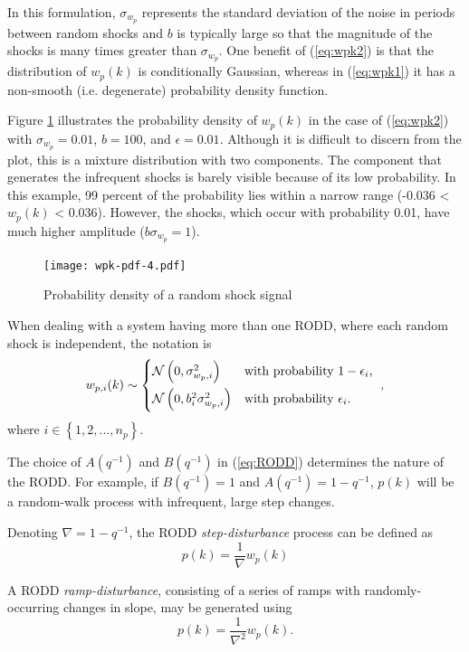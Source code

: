 In this formulation, $\sigma_{w_p}$ represents the standard deviation of the noise in periods between random shocks and $b$ is typically large so that the magnitude of the shocks is many times greater than $\sigma_{w_p}$. One benefit of (\ref{eq:wpk2}) is that the distribution of $w_p(k)$ is conditionally Gaussian, whereas in (\ref{eq:wpk1}) it has a non-smooth (i.e. degenerate) probability density function.

Figure \ref{fig:wpk-pdf} illustrates the probability density of $w_p(k)$ in the case of (\ref{eq:wpk2}) with $\sigma_{w_p}=0.01$, $b=100$, and $\epsilon=0.01$. Although it is difficult to discern from the plot, this is a mixture distribution with two components. The component that generates the infrequent shocks is barely visible because of its low probability. In this example, 99 percent of the probability lies within a narrow range (-0.036 < $w_p(k)$ < 0.036). However, the shocks, which occur with probability 0.01, have much higher amplitude ($b\sigma_{w_p}=1$).

\begin{figure}[htp]
	\centering
	\texttt{[image: wpk-pdf-4.pdf]}
	\caption{Probability density of a random shock signal}
	\label{fig:wpk-pdf}
\end{figure}

When dealing with a system having more than one RODD, where each random shock is independent, the notation is
\begin{equation} \label{eq:wpik2}
	w_{p,i}(k) \sim 
	\begin{cases*}
		\mathcal{N}\left(0, \sigma_{w_p,i}^2\right) & with probability $1-\epsilon_i$, \\
		\mathcal{N}\left(0, b_i^2\sigma_{w_p,i}^2\right) & with probability $\epsilon_i$.
	\end{cases*},
\end{equation}
where $i \in \left\{1, 2, ..., n_p\right\}$.

The choice of $A(q^{-1})$ and $B(q^{-1})$ in (\ref{eq:RODD}) determines the nature of the RODD. For example, if $B(q^{-1})=1$ and $A(q^{-1})=1-q^{-1}$, $p(k)$ will be a random-walk process with infrequent, large step changes.

Denoting $\nabla=1-q^{-1}$, the RODD \textit{step-disturbance} process can be defined as
\begin{equation} \label{eq:RODD-step}
	p(k)= \frac{1}{\nabla}w_p(k)
\end{equation}

A RODD \textit{ramp-disturbance}, consisting of a series of ramps with randomly-occurring changes in slope, may be generated using
\begin{equation} \label{eq:RODD-ramp}
	p(k)= \frac{1}{\nabla^2}w_p(k).
\end{equation}

